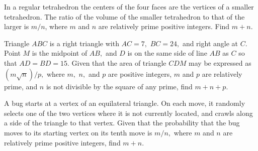 \documentclass[11pt]{article}
\theoremstyle{definition}
\begin{document}
%	












\begin{question}[name={2003 AIME II, \href{https://artofproblemsolving.com/community/c4p713207}{Problem 4}}]
	In a regular tetrahedron the centers of the four faces are the vertices of a smaller tetrahedron. The ratio of the volume of the smaller tetrahedron to that of the larger is $m/n$, where $m$ and $n$ are relatively prime positive integers. Find $m+n.$	
	
\end{question}


%	








\begin{question}[name={2003 AIME II, \href{https://artofproblemsolving.com/community/c4p713218}{Problem 11}}]
	Triangle $ABC$ is a right triangle with $AC=7,$ $BC=24,$ and right angle at $C.$ Point $M$ is the midpoint of $AB,$ and $D$ is on the same side of line $AB$ as $C$ so that $AD=BD=15.$ Given that the area of triangle $CDM$ may be expressed as $(m\sqrt{n})/{p},$ where $m,$ $n,$ and $p$ are positive integers, $m$ and $p$ are relatively prime, and $n$ is not divisible by the square of any prime, find $m+n+p.$
\end{question}


%	












\begin{question}[name={2003 AIME II, \href{https://artofproblemsolving.com/community/c4p713221}{Problem 13}}]
	A bug starts at a vertex of an equilateral triangle. On each move, it randomly selects one of the two vertices where it is not currently located, and crawls along a side of the triangle to that vertex. Given that the probability that the bug moves to its starting vertex on its tenth move is $m/n,$ where $m$ and $n$ are relatively prime positive integers, find $m+n$.
\end{question}
\end{document}
